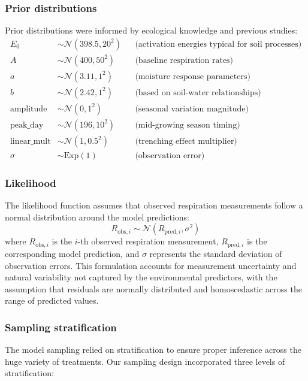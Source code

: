 \documentclass[12pt,a4paper]{article}
\begin{document}
\subsubsection{Prior distributions}
Prior distributions were informed by ecological knowledge and previous studies:
\begin{align}
E_0 &\sim \mathcal{N}(398.5, 20^2) && \text{(activation energies typical for soil processes)} \\
A &\sim \mathcal{N}(400, 50^2) && \text{(baseline respiration rates)} \\
a &\sim \mathcal{N}(3.11, 1^2) && \text{(moisture response parameters)} \\
b &\sim \mathcal{N}(2.42, 1^2) && \text{(based on soil-water relationships)} \\
\text{amplitude} &\sim \mathcal{N}(0, 1^2) && \text{(seasonal variation magnitude)} \\
\text{peak\_day} &\sim \mathcal{N}(196, 10^2) && \text{(mid-growing season timing)} \\
\text{linear\_mult} &\sim \mathcal{N}(1, 0.5^2) && \text{(trenching effect multiplier)} \\
\sigma &\sim \text{Exp}(1) && \text{(observation error)}
\end{align}

\subsubsection{Likelihood}
The likelihood function assumes that observed respiration measurements follow a normal distribution around the model predictions:
\begin{equation}
R_{\text{obs},i} \sim \mathcal{N}(R_{\text{pred},i}, \sigma^2)
\end{equation}
where $R_{\text{obs},i}$ is the $i$-th observed respiration measurement, $R_{\text{pred},i}$ is the corresponding model prediction, and $\sigma$ represents the standard deviation of observation errors. This formulation accounts for measurement uncertainty and natural variability not captured by the environmental predictors, with the assumption that residuals are normally distributed and homoscedastic across the range of predicted values.

\subsubsection{Sampling stratification}
The model sampling relied on stratification to ensure proper inference across the huge variety of treatments. Our sampling design incorporated three levels of stratification:
\end{document}
